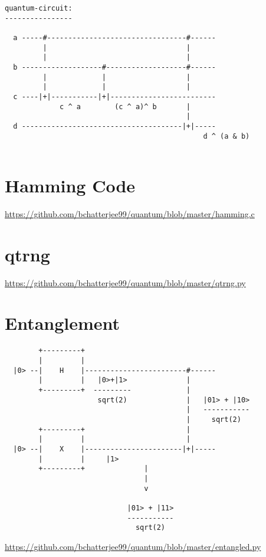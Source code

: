 \documentclass{article}
\begin{document}
\begin{verbatim}
quantum-circuit:
----------------

  a -----#---------------------------------#------
         |                                 |
         |                                 |
  b -------------------#-------------------#------
         |             |                   |
         |             |                   |
  c ----|+|-----------|+|-------------------------
             c ^ a        (c ^ a)^ b       |
                                           |
  d --------------------------------------|+|-----
                                               d ^ (a & b)


\end{verbatim}


\section{Hamming Code}
\href{https://github.com/bchatterjee99/quantum/blob/master/hamming.c}{https://github.com/bchatterjee99/quantum/blob/master/hamming.c}



\section{qtrng}
\href{https://github.com/bchatterjee99/quantum/blob/master/qtrng.py}{https://github.com/bchatterjee99/quantum/blob/master/qtrng.py}


\section{Entanglement}
\begin{verbatim}
        +---------+                                         
        |         |                                         
  |0> --|    H    |------------------------#------
        |         |   |0>+|1>              |               
        +---------+  ---------             |     
                      sqrt(2)              |   |01> + |10>    
                                           |   ----------- 
                                           |     sqrt(2)   
        +---------+                        |    
        |         |                        |    
  |0> --|    X    |-----------------------|+|-----
        |         |     |1>                    
        +---------+              |                   
                                 |                    
                                 v                  
                                                               
                             |01> + |11>                     
                             -----------
                               sqrt(2)              
\end{verbatim}
\href{https://github.com/bchatterjee99/quantum/blob/master/entangled.py}{https://github.com/bchatterjee99/quantum/blob/master/entangled.py}
\end{document}
